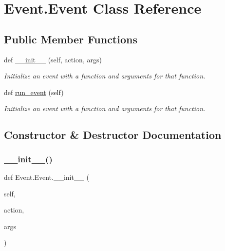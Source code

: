 \hypertarget{class_event_1_1_event}{}\section{Event.\+Event Class Reference}
\label{class_event_1_1_event}
\subsection*{Public Member Functions}
\begin{DoxyCompactItemize}
\item 
def \hyperlink{class_event_1_1_event_a59dde669156fd5abc94b3800ece49b36}{\+\_\+\+\_\+init\+\_\+\+\_\+} (self, action, args)
\begin{DoxyCompactList}\small\item\em Initialize an event with a function and arguments for that function. \end{DoxyCompactList}\item 
def \hyperlink{class_event_1_1_event_a06520d9b62a64266891af59f31c5ccad}{run\+\_\+event} (self)
\begin{DoxyCompactList}\small\item\em Initialize an event with a function and arguments for that function. \end{DoxyCompactList}\end{DoxyCompactItemize}


\subsection{Constructor \& Destructor Documentation}
\mbox{\label{class_event_1_1_event_a59dde669156fd5abc94b3800ece49b36}} 
\subsubsection{\texorpdfstring{\+\_\+\+\_\+init\+\_\+\+\_\+()}{\_\_init\_\_()}}
{\footnotesize\ttfamily def Event.\+Event.\+\_\+\+\_\+init\+\_\+\+\_\+ (\begin{DoxyParamCaption}\item[{}]{self,  }\item[{}]{action,  }\item[{}]{args }\end{DoxyParamCaption})}



